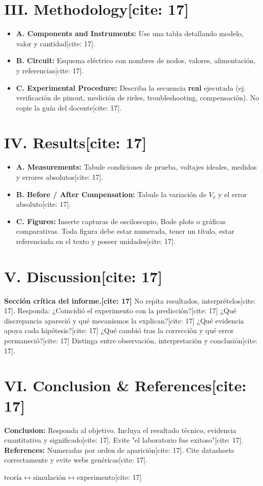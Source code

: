 \documentclass[11pt, a4paper]{article}
\begin{document}
\section*{III. Methodology[cite: 17]}
\begin{itemize}
    \item \textbf{A. Components and Instruments:} Use una tabla detallando modelo, valor y cantidad[cite: 17].
    \item \textbf{B. Circuit:} Esquema eléctrico con nombres de nodos, valores, alimentación, y referencias[cite: 17].
    \item \textbf{C. Experimental Procedure:} Describa la secuencia \textbf{real} ejecutada (ej. verificación de pinout, medición de rieles, troubleshooting, compensación). No copie la guía del docente[cite: 17].
\end{itemize}

\section*{IV. Results[cite: 17]}
\begin{itemize}
    \item \textbf{A. Measurements:} Tabule condiciones de prueba, voltajes ideales, medidos y errores absolutos[cite: 17].
    \item \textbf{B. Before / After Compensation:} Tabule la variación de $V_o$ y el error absoluto[cite: 17].
    \item \textbf{C. Figures:} Inserte capturas de osciloscopio, Bode plots o gráficas comparativas. Toda figura debe estar numerada, tener un título, estar referenciada en el texto y poseer unidades[cite: 17].
\end{itemize}

\section*{V. Discussion[cite: 17]}
\textbf{Sección crítica del informe.[cite: 17]} No repita resultados, interprételos[cite: 17]. Responda: ¿Coincidió el experimento con la predicción?[cite: 17] ¿Qué discrepancia apareció y qué mecanismos la explican?[cite: 17] ¿Qué evidencia apoya cada hipótesis?[cite: 17] ¿Qué cambió tras la corrección y qué error permaneció?[cite: 17] Distinga entre observación, interpretación y conclusión[cite: 17].

\section*{VI. Conclusion \& References[cite: 17]}
\textbf{Conclusion:} Responda al objetivo. Incluya el resultado técnico, evidencia cuantitativa y significado[cite: 17]. Evite "el laboratorio fue exitoso"[cite: 17]. \\
\textbf{References:} Numeradas por orden de aparición[cite: 17]. Cite datasheets correctamente y evite webs genéricas[cite: 17].

\begin{tcolorbox}[colback=white, colframe=black, title=\textbf{Comparación Recomendada para el Informe[cite: 17]}]
    \centering $\boxed{ \text{teoría} \leftrightarrow \text{simulación} \leftrightarrow \text{experimento} }$[cite: 17]
\end{tcolorbox}
\end{document}
